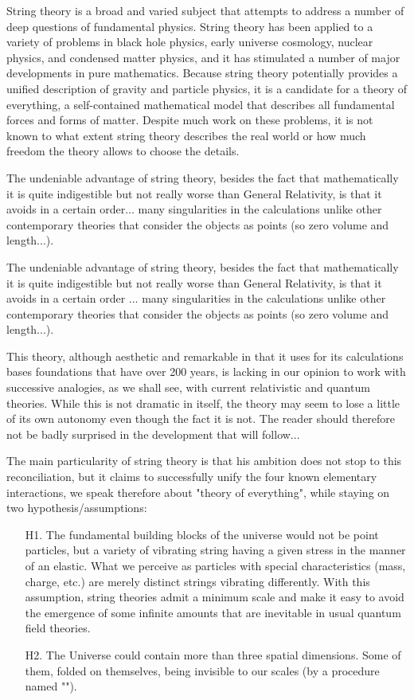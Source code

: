 	String theory is a broad and varied subject that attempts to address a number of deep questions of fundamental physics. String theory has been applied to a variety of problems in black hole physics, early universe cosmology, nuclear physics, and condensed matter physics, and it has stimulated a number of major developments in pure mathematics. Because string theory potentially provides a unified description of gravity and particle physics, it is a candidate for a theory of everything, a self-contained mathematical model that describes all fundamental forces and forms of matter. Despite much work on these problems, it is not known to what extent string theory describes the real world or how much freedom the theory allows to choose the details.
	
	The undeniable advantage of string theory, besides the fact that mathematically it is quite indigestible but not really worse than General Relativity, is that it avoids in a certain order... many singularities in the calculations unlike other contemporary theories that consider the objects as points (so zero volume and length...).
	
	The undeniable advantage of string theory, besides the fact that mathematically it is quite indigestible but not really worse than General Relativity, is that it avoids in a certain order ... many singularities in the calculations unlike other contemporary theories that consider the objects as points (so zero volume and length...).
	
	This theory, although aesthetic and remarkable in that it uses for its calculations bases foundations that have over 200 years, is lacking in our opinion to work with successive analogies, as we shall see, with current relativistic and quantum theories. While this is not dramatic in itself, the theory may seem to lose a little of its own autonomy even though the fact it is not. The reader should therefore not be badly surprised in the development that will follow...
	
	The main particularity of string theory is that his ambition does not stop to this reconciliation, but it claims to successfully unify the four known elementary interactions, we speak therefore about "theory of everything", while staying on two hypothesis/assumptions:
	
	\begin{enumerate}
		\item[H1.] The fundamental building blocks of the universe would not be point particles, but a variety of vibrating string having a given stress in the manner of an elastic. What we perceive as particles with special characteristics (mass, charge, etc.) are merely distinct strings vibrating differently. With this assumption, string theories admit a minimum scale and make it easy to avoid the emergence of some infinite amounts that are inevitable in usual quantum field theories.
		\item[H2.] The Universe could contain more than three spatial dimensions. Some of them, folded on themselves, being invisible to our scales (by a procedure named "").
	\end{enumerate}
	
